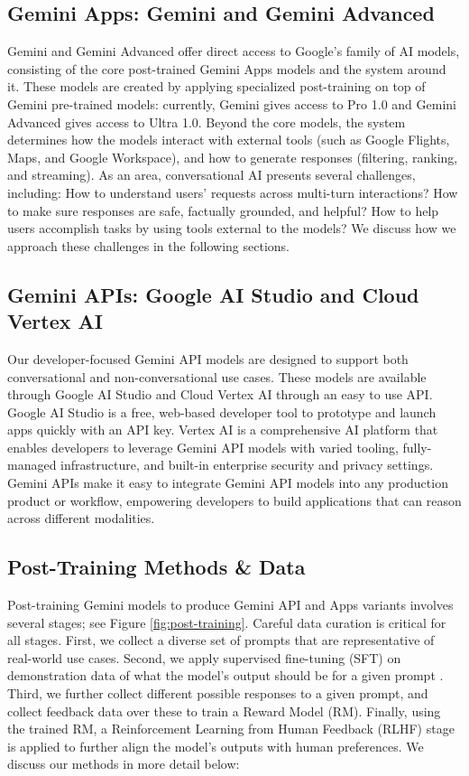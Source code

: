 \subsection{Gemini Apps: Gemini and Gemini Advanced}

Gemini and Gemini Advanced offer direct access to Google's family of AI models, consisting of the core post-trained Gemini Apps models and the system around it. These models are created by applying specialized post-training on top of Gemini pre-trained models: currently, Gemini gives access to Pro 1.0 and Gemini Advanced gives access to Ultra 1.0. Beyond the core models, the system determines how the models interact with external tools (such as Google Flights, Maps, and Google Workspace), and how to generate responses (filtering, ranking, and streaming). As an area, conversational AI presents several challenges, including: How to understand users’ requests across multi-turn interactions? How to make sure responses are safe, factually grounded, and helpful? How to help users accomplish tasks by using tools external to the models? We discuss how we approach these challenges in the following sections.

\subsection{Gemini APIs: Google AI Studio and Cloud Vertex AI}

Our developer-focused Gemini API models are designed to support both conversational and non-conversational use cases. These models are available through Google AI Studio and Cloud Vertex AI through an easy to use API. Google AI Studio is a free, web-based developer tool to prototype and launch apps quickly with an API key. Vertex AI is a comprehensive AI platform that enables developers to leverage Gemini API models with varied tooling, fully-managed infrastructure, and built-in enterprise security and privacy settings. Gemini APIs make it easy to integrate Gemini API models into any production product or workflow, empowering developers to build applications that can reason across different modalities.

\subsection{Post-Training Methods \& Data}
\label{sec:post-training-data}

Post-training Gemini models to produce Gemini API and Apps variants involves several stages; see Figure \ref{fig:post-training}. Careful data curation is critical for all stages. First, we collect a diverse set of prompts that are representative of real-world use cases. Second, we apply supervised fine-tuning (SFT) on demonstration data of what the model’s output should be for a given prompt \citep{wei2021finetuned, ouyang2022training, mishra2021cross}. Third, we further collect different possible responses to a given prompt, and collect feedback data over these to train a Reward Model (RM). Finally, using the trained RM, a Reinforcement Learning from Human Feedback (RLHF) stage~\citep{Bai2022-us} is applied to further align the model's outputs with human preferences. We discuss our methods in more detail below:

